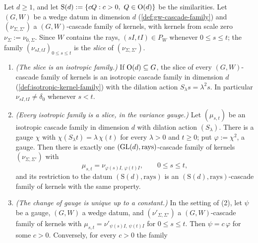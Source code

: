 \begin{proposition}
\label{prop:isotropic-corner}
\leanok
Let $d \ge 1$, and let $\mathrm S(d) := \{cQ : c > 0,\ Q \in \mathrm{O}(d)\}$ be the similarities. Let
$(G, W)$ be a wedge datum in dimension $d$ (\ref{def:gw-cascade-family}) and
$(\nu_{\Sigma,\Sigma'})$ a $(G, W)$-cascade family of kernels, with kernels from scale zero
$\nu_\Sigma := \nu_{0,\Sigma}$. Since $W$ contains the rays, $(sI, tI) \in P_W$ whenever
$0 \le s \le t$; the family $(\nu_{sI,tI})_{0 \le s \le t}$ is the \emph{slice} of
$(\nu_{\Sigma,\Sigma'})$.
\begin{enumerate}
\item \emph{(The slice is an isotropic family.)} If $\mathrm{O}(d) \subseteq G$, the slice of every
$(G, W)$-cascade family of kernels is an isotropic cascade family in dimension $d$
(\ref{def:isotropic-kernel-family}) with the dilation action $S_\lambda s = \lambda^2 s$. In
particular $\nu_{sI,tI} \ne \delta_0$ whenever $s < t$.
\item \emph{(Every isotropic family is a slice, in the variance gauge.)} Let $(\mu_{s,t})$ be an
isotropic cascade family in dimension $d$ with dilation action $(S_\lambda)$. There is a gauge
$\chi$ with $\chi(S_\lambda t) = \lambda\,\chi(t)$ for every $\lambda > 0$ and $t \ge 0$; put
$\varphi := \chi^2$, a gauge. Then there is exactly one $(\mathrm{GL}(d), \text{rays})$-cascade family of
kernels $(\nu_{\Sigma,\Sigma'})$ with
\[
  \mu_{s,t} = \nu_{\varphi(s)I,\,\varphi(t)I}, \qquad 0 \le s \le t ,
\]
and its restriction to the datum $(\mathrm S(d), \text{rays})$ is an $(\mathrm S(d), \text{rays})$-cascade family of kernels
with the same property.
\item \emph{(The change of gauge is unique up to a constant.)} In the setting of (2), let $\psi$ be
a gauge, $(G, W)$ a wedge datum, and $(\nu'_{\Sigma,\Sigma'})$ a
$(G, W)$-cascade family of kernels with $\mu_{s,t} = \nu'_{\psi(s)I,\,\psi(t)I}$ for
$0 \le s \le t$. Then $\psi = c\,\varphi$ for some $c > 0$. Conversely, for every $c > 0$ the family

\end{enumerate}
\end{proposition}
